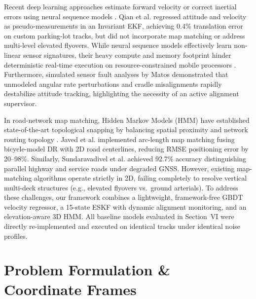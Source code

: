 \documentclass[conference]{IEEEtran}
\begin{document}
Recent deep learning approaches estimate forward velocity or correct inertial errors using neural sequence models \cite{brossard2020, lawal2024, mamun2026}. Qian et al. \cite{qian2025} regressed attitude and velocity as pseudo-measurements in an Invariant EKF, achieving 0.4\% translation error on custom parking-lot tracks, but did not incorporate map matching or address multi-level elevated flyovers. While neural sequence models effectively learn non-linear sensor signatures, their heavy compute and memory footprint hinder deterministic real-time execution on resource-constrained mobile processors \cite{deshmukh2025}. Furthermore, simulated sensor fault analyses by Matos \cite{matos2025} demonstrated that unmodeled angular rate perturbations and cradle misalignments rapidly destabilize attitude tracking, highlighting the necessity of an active alignment supervisor.

In road-network map matching, Hidden Markov Models (HMM) have established state-of-the-art topological snapping by balancing spatial proximity and network routing topology \cite{newson2009}. Javed et al. \cite{javed2024} implemented arc-length map matching fusing bicycle-model DR with 2D road centerlines, reducing RMSE positioning error by 20--98\%. Similarly, Sundaravadivel et al. \cite{sundar2026} achieved 92.7\% accuracy distinguishing parallel highway and service roads under degraded GNSS. However, existing map-matching algorithms operate strictly in 2D, failing completely to resolve vertical multi-deck structures (e.g., elevated flyovers vs.\ ground arterials). To address these challenges, our framework combines a lightweight, framework-free GBDT velocity regressor, a 15-state ESKF with dynamic alignment monitoring, and an elevation-aware 3D HMM. All baseline models evaluated in Section~VI were directly re-implemented and executed on identical tracks under identical noise profiles.

\section{Problem Formulation \& Coordinate Frames}
\end{document}
